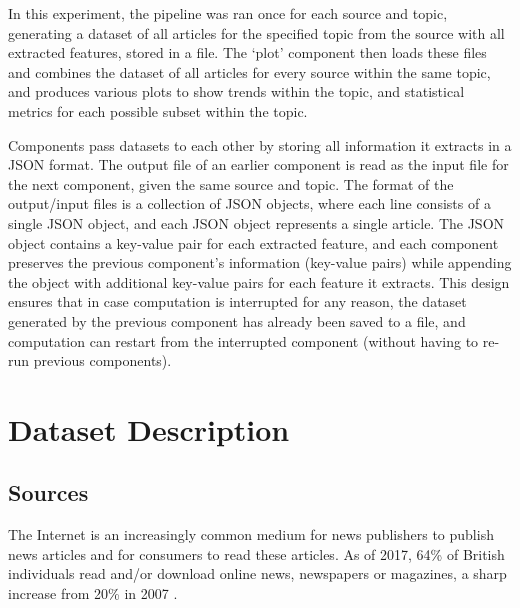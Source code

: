 \documentclass{report}
\begin{document}
In this experiment, the pipeline was ran once for each source and topic, generating a dataset of all articles for the specified topic from the source with all extracted features, stored in a file.
The `plot' component then loads these files and combines the dataset of all articles for every source within the same topic, and produces various plots to show trends within the topic, and statistical metrics for each possible subset within the topic.

Components pass datasets to each other by storing all information it extracts in a JSON format.
The output file of an earlier component is read as the input file for the next component, given the same source and topic.
The format of the output/input files is a collection of JSON objects, where each line consists of a single JSON object, and each JSON object represents a single article.
The JSON object contains a key-value pair for each extracted feature, and each component preserves the previous component's information (key-value pairs) while appending the object with additional key-value pairs for each feature it extracts.
This design ensures that in case computation is interrupted for any reason, the dataset generated by the previous component has already been saved to a file, and computation can restart from the interrupted component (without having to re-run previous components).

\section{Dataset Description} \label{Dataset Description}  %

\subsection{Sources} \label{sources}

The Internet is an increasingly common medium for news publishers to publish news articles and for consumers to read these articles.
As of 2017, 64\% of British individuals read and/or download online news, newspapers or magazines, a sharp increase from 20\% in 2007 \cite{statista2018share}. 
\end{document}
